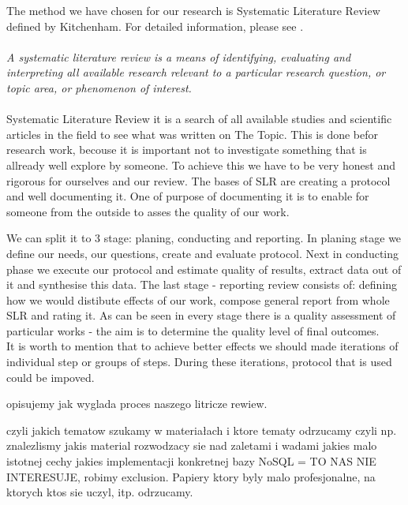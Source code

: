 \documentclass[times, 10pt,twocolumn]{article}
\begin{document}
The method we have chosen for our research is Systematic Literature Review defined by Kitchenham. For detailed information, please see \cite{kitchenham}. 
~\\
~\\
\emph {A systematic literature review is a means of identifying, evaluating and interpreting all available research relevant to a particular research question, or topic area, or phenomenon of interest.} \cite[p.~3]{kitchenham}
~\\
~\\
Systematic Literature Review it is a search of all available studies and scientific articles in the field to see what was written on The Topic. This is done befor research work, becouse it is important not to investigate something that is allready well explore by someone. To achieve this we have to be very honest and rigorous for ourselves and our review. The bases of SLR are creating a protocol and well documenting it. One of purpose of documenting it is to enable for someone from the outside to asses the quality of our work. 

We can split it to 3 stage: planing, conducting and reporting. In planing stage we define our needs, our questions, create and evaluate protocol. Next in conducting phase we execute our protocol and estimate quality of results, extract data out of it and synthesise this data. The last stage - reporting review consists of: defining how we would distibute effects of our work, compose general report from whole SLR and rating it. As can be seen in every stage there is a quality assessment of particular works - the aim is to determine the quality level of final outcomes.
~\\
It is worth to mention that to achieve better effects we should made iterations of individual step or groups of steps. During these iterations, protocol that is used could be impoved.


opisujemy jak wyglada proces naszego litricze rewiew.


czyli jakich tematow szukamy w materiałach
i ktore tematy odrzucamy
czyli np. znalezlismy jakis material rozwodzacy sie nad zaletami i wadami jakies malo istotnej cechy jakies implementacji konkretnej bazy NoSQL = TO NAS NIE INTERESUJE, robimy exclusion. 
Papiery ktory byly malo profesjonalne, na ktorych ktos sie uczyl, itp. odrzucamy.
\end{document}
